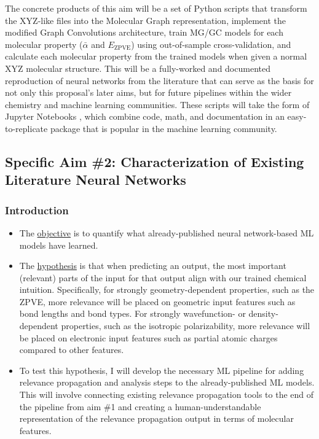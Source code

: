 \documentclass[12pt]{article}
\begin{document}
The concrete products of this aim will be a set of Python scripts that transform the XYZ-like files into the Molecular Graph representation, implement the modified Graph Convolutions architecture, train MG/GC models for each molecular property (\(\bar{\alpha}\) and \(E_\text{ZPVE}\)) using out-of-sample cross-validation, and calculate each molecular property from the trained models when given a normal XYZ molecular structure. This will be a fully-worked and documented reproduction of neural networks from the literature that can serve as the basis for not only this proposal's later aims, but for future pipelines within the wider chemistry and machine learning communities. These scripts will take the form of Jupyter Notebooks \cite{jupyter,PER-GRA:2007}, which combine code, math, and documentation in an easy-to-replicate package that is popular in the machine learning community.

\subsection{Specific Aim \#2: Characterization of Existing Literature Neural Networks}
\label{sec:orge8097c0}

\subsubsection{Introduction}
\label{sec:orgde5013a}

\begin{itemize}
\item The \uline{objective} is to quantify what already-published neural network-based ML models have learned.

\item The \uline{hypothesis} is that when predicting an output, the most important (relevant) parts of the input for that output align with our trained chemical intuition. Specifically, for strongly geometry-dependent properties, such as the ZPVE, more relevance will be placed on geometric input features such as bond lengths and bond types. For strongly wavefunction- or density-dependent properties, such as the isotropic polarizability, more relevance will be placed on electronic input features such as partial atomic charges compared to other features.

\item To test this hypothesis, I will develop the necessary ML pipeline for adding relevance propagation and analysis steps to the already-published ML models. This will involve connecting existing relevance propagation tools \cite{JMLR:v17:15-618,github:lrp,github:lrp_tf,github:lrp_tf2} to the end of the pipeline from aim \#1 and creating a human-understandable representation of the relevance propagation output in terms of molecular features.
\end{itemize}
\end{document}
